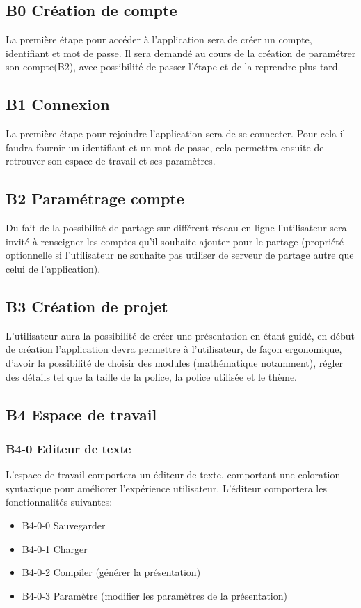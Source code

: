 \documentclass[11pt,a4paper]{article}
\begin{document}
\subsection{B0 Création de compte}
La première étape pour accéder à l'application sera de créer un compte, identifiant et mot de passe. Il sera demandé au cours de la création de paramétrer son compte(B2), avec possibilité de passer l'étape et de la reprendre plus tard.

\subsection{B1 Connexion}
La première étape pour rejoindre l'application sera de se connecter. Pour cela il faudra fournir un identifiant et un mot de passe, cela permettra ensuite de retrouver son espace de travail et ses paramètres.

\subsection{B2 Paramétrage compte}
Du fait de la possibilité de partage sur différent réseau en ligne l'utilisateur sera invité à renseigner les comptes qu'il souhaite ajouter pour le partage (propriété optionnelle si l'utilisateur ne souhaite pas utiliser de serveur de partage autre que celui de l'application).

\subsection{B3 Création de projet}
L'utilisateur aura la possibilité de créer une présentation en étant guidé, en début de création l'application devra permettre à l'utilisateur, de façon ergonomique, d'avoir la possibilité de choisir des modules (mathématique notamment), régler des détails tel que la taille de la police, la police utilisée et le thème.

\subsection{B4 Espace de travail}
\subsubsection{B4-0 Editeur de texte}
L'espace de travail comportera un éditeur de texte, comportant une coloration syntaxique pour améliorer l'expérience utilisateur. L'éditeur comportera les fonctionnalités suivantes:
\begin{itemize}
\item B4-0-0 Sauvegarder
\item B4-0-1 Charger
\item B4-0-2 Compiler (générer la présentation) 
\item B4-0-3 Paramètre (modifier les paramètres de la présentation)
\end{itemize}
\end{document}
